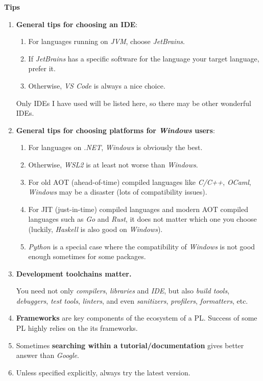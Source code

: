 \documentclass{article}
\begin{document}
\textbf{Tips}
\begin{enumerate}
    \item \textbf{General tips for choosing an IDE}:
    \begin{enumerate}
        \item For languages running on \emph{JVM}, choose \emph{JetBrains}.
        \item If \emph{JetBrains} has a specific software for the language your target language, prefer it.
        \item Otherwise, \emph{VS Code} is always a nice choice.
    \end{enumerate}
        Only IDEs I have used will be listed here, so there may be other wonderful IDEs.
    \item \textbf{General tips for choosing platforms for \emph{Windows} users}:
    \begin{enumerate}
        \item For languages on \emph{.NET}, \emph{Windows} is obviously the best.
        \item Otherwise, \emph{WSL2} is at least not worse than \emph{Windows}.
        \item For old AOT (ahead-of-time) compiled languages like \emph{C/C++}, \emph{OCaml}, \emph{Windows} may be a disaster (lots of compatibility issues).
        \item For JIT (just-in-time) compiled languages and modern AOT compiled languages such as \emph{Go} and \emph{Rust}, it does not matter which one you choose (luckily, \emph{Haskell} is also good on \emph{Windows}).
        \item \emph{Python} is a special case where the compatibility of \emph{Windows} is not good enough sometimes for some packages.
    \end{enumerate}
    \item \textbf{Development toolchains matter.}
    
    You need not only \emph{compilers}, \emph{libraries} and \emph{IDE}, but also \emph{build tools}, \emph{debuggers}, \emph{test tools}, \emph{linters}, and even \emph{sanitizers}, \emph{profilers}, \emph{formatters}, etc.
    
    \item \textbf{Frameworks} are key components of the ecosystem of a PL.
    Success of some PL highly relies on the its frameworks.
    \item Sometimes \textbf{searching within a tutorial/documentation} gives better answer than \emph{Google}.
    \item Unless specified explicitly, always try the latest version.
\end{enumerate}
\end{document}
